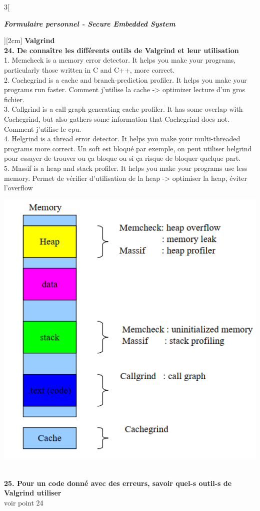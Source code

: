 \begin{multicols}{3}[\centerline{ \large\em \textbf{Formulaire personnel - Secure Embedded System}}][2cm]
\newpage
{\Large \textbf{Valgrind}}
\\ \textbf{24. De connaître les différents outils de Valgrind et leur utilisation\\}
1. Memcheck is a memory error detector. It helps you make your programs, particularly those written in C and C++, more correct.\\
2. Cachegrind is a cache and branch-prediction profiler. It helps you make your programs run faster. Comment j'utilise la cache -> optimizer lecture d'un gros fichier.\\
3. Callgrind is a call-graph generating cache profiler. It has some overlap with Cachegrind, but also gathers some information that Cachegrind does not. Comment j'utilise le cpu.\\
4. Helgrind is a thread error detector. It helps you make your multi-threaded programs more correct. Un soft est bloqué par exemple, on peut utiliser helgrind pour essayer de trouver ou ça bloque ou si ça risque de bloquer quelque part.\\
5. Massif is a heap and stack profiler. It helps you make your programs use less memory. Permet de vérifier d'utilisation de la heap -> optimiser la heap, éviter l'overflow\\
\begin{minipage}{\linewidth}
	\centering
    \includegraphics[width =0.6\columnwidth]{images/10.png}
\end{minipage}
\\ \textbf{25. Pour un code donné avec des erreurs, savoir quel-s outil-s de Valgrind utiliser\\}
voir point 24\\
\columnbreak


\end{multicols}
